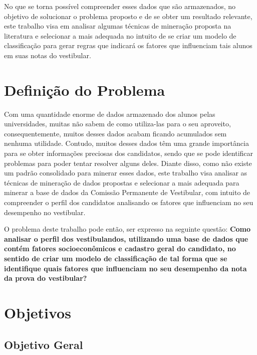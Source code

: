 No que se torna possível compreender esses dados que são armazenados, no objetivo de solucionar o problema proposto e de se obter um resultado relevante, este trabalho visa em analisar algumas técnicas de mineração proposta na literatura e selecionar a mais adequada no intuito de se criar um modelo de classificação para gerar regras que indicará os fatores que influenciam tais alunos em suas notas do vestibular.


\section{Definição do Problema}

\par
Com uma quantidade enorme de dados armazenado dos alunos pelas universidades, muitas não sabem de como utiliza-las para o seu aproveito, consequentemente, muitos desses dados acabam ficando acumulados sem nenhuma utilidade. Contudo, muitos desses dados têm uma grande importância para se obter informações preciosas dos candidatos, sendo que se pode identificar problemas para poder tentar resolver alguns deles. Diante disso, como não existe um padrão consolidado para minerar esses dados, este trabalho visa analisar as técnicas de mineração de dados propostas e selecionar a mais adequada para minerar a base de dados da Comissão Permanente de Vestibular, com intuito de compreender o perfil dos candidatos analisando os fatores que influenciam no seu desempenho no vestibular.

\par
O problema deste trabalho pode então, ser expresso na seguinte questão: \textbf{Como analisar o perfil dos vestibulandos, utilizando uma base de dados que contém fatores socioeconômicos e cadastro geral do candidato, no sentido de criar um modelo de classificação de tal forma que se identifique quais fatores que influenciam no seu desempenho da nota  da prova do vestibular? }



\section{Objetivos}

\subsection{Objetivo Geral}

